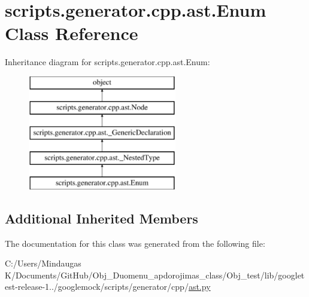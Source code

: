 \hypertarget{classscripts_1_1generator_1_1cpp_1_1ast_1_1_enum}{}\section{scripts.\+generator.\+cpp.\+ast.\+Enum Class Reference}
\label{classscripts_1_1generator_1_1cpp_1_1ast_1_1_enum}
Inheritance diagram for scripts.\+generator.\+cpp.\+ast.\+Enum\+:\begin{figure}[H]
\begin{center}
\leavevmode
\includegraphics[height=5.000000cm]{da/dfb/classscripts_1_1generator_1_1cpp_1_1ast_1_1_enum}
\end{center}
\end{figure}
\subsection*{Additional Inherited Members}


The documentation for this class was generated from the following file\+:\begin{DoxyCompactItemize}
\item 
C\+:/\+Users/\+Mindaugas K/\+Documents/\+Git\+Hub/\+Obj\+\_\+\+Duomenu\+\_\+apdorojimas\+\_\+class/\+Obj\+\_\+test/lib/googletest-\/release-\/1../googlemock/scripts/generator/cpp/\mbox{\hyperlink{_obj__test_2lib_2googletest-release-1_88_81_2googlemock_2scripts_2generator_2cpp_2ast_8py}{ast.\+py}}\end{DoxyCompactItemize}

